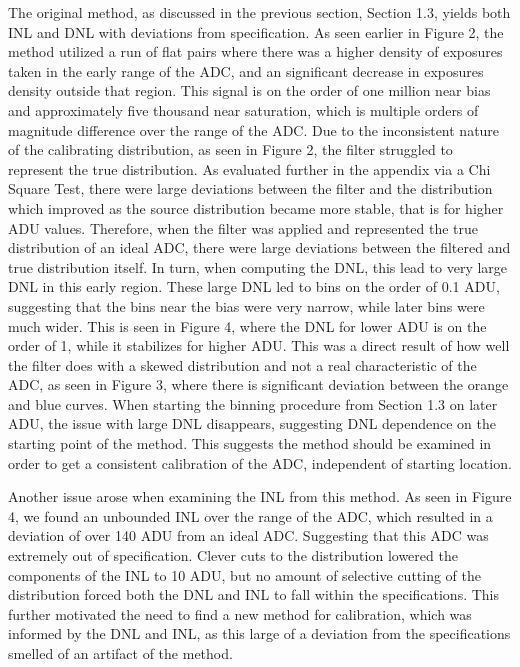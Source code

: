 \documentclass[11pt, letterpaper]{article}
\begin{document}
The original method, as discussed in the previous section, Section 1.3, yields both INL and DNL with deviations from specification. 
As seen earlier in Figure 2, the method utilized a run of flat pairs where there was a higher density of exposures taken in the early range of the ADC, and an significant decrease in exposures density outside that region. 
This signal is on the order of one million near bias and approximately five thousand near saturation, which is multiple orders of magnitude difference over the range of the ADC.
Due to the inconsistent nature of the calibrating distribution, as seen in Figure 2, the filter struggled to represent the true distribution. 
As evaluated further in the appendix via a Chi Square Test, there were large deviations between the filter and the distribution which improved as the source distribution became more stable, that is for higher ADU values. 
Therefore, when the filter was applied and represented the true distribution of an ideal ADC, there were large deviations between the filtered and true distribution itself.
In turn, when computing the DNL, this lead to very large DNL in this early region. 
These large DNL led to bins on the order of 0.1 ADU, suggesting that the bins near the bias were very narrow, while later bins were much wider. 
This is seen in Figure 4, where the DNL for lower ADU is on the order of 1, while it stabilizes for higher ADU. 
This was a direct result of how well the filter does with a skewed distribution and not a real characteristic of the ADC, as seen in Figure 3, where there is significant deviation between the orange and blue curves. 
When starting the binning procedure from Section 1.3 on later ADU, the issue with large DNL disappears, suggesting DNL dependence on the starting point of the method. 
This suggests the method should be examined in order to get a consistent calibration of the ADC, independent of starting location.
\indent 


Another issue arose when examining the INL from this method. 
As seen in Figure 4, we found an unbounded INL over the range of the ADC, which resulted in a deviation of over 140 ADU from an ideal ADC. 
Suggesting that this ADC was extremely out of specification. 
Clever cuts to the distribution lowered the components of the INL to 10 ADU, but no amount of selective cutting of the distribution forced both the DNL and INL to fall within the specifications. 
This further motivated the need to find a new method for calibration, which was informed by the DNL and INL, as this large of a deviation from the specifications smelled of an artifact of the method. 
\end{document}
